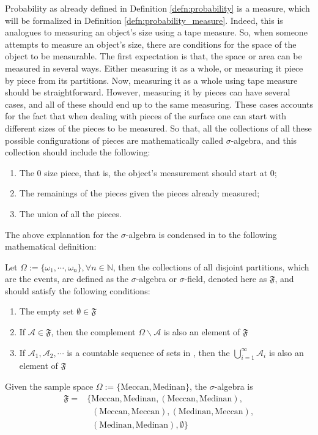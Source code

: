 Probability as already defined in Definition \ref{defn:probability} is a measure, which will be formalized in Definition \ref{defn:probability_measure}. Indeed, this is analogues to measuring an object's size using a tape measure. So, when someone attempts to measure an object's size, there are conditions for the space of the object to be measurable. The first expectation is that, the space or area can be measured in several ways. Either measuring it as a whole, or measuring it piece by piece from its partitions. Now, measuring it as a whole using tape measure should be straightforward. However, measuring it by pieces can have several cases, and all of these should end up to the same measuring. These cases accounts for the fact that when dealing with pieces of the surface one can start with different sizes of the pieces to be measured. So that, all the collections of all these possible configurations of pieces are mathematically called $\sigma$-algebra, and this collection should include the following:
\begin{enumerate}
    \item The 0 size piece, that is, the object's measurement should start at 0;
    \item The remainings of the pieces given the pieces already measured;
    \item The union of all the pieces.
\end{enumerate}
The above explanation for the $\sigma$-algebra is condensed in to the following mathematical definition:
\begin{defn}\label{defn:sigma_algebra}
Let $\Omega:=\{\omega_1,\cdots,\omega_n\}, \forall n\in\mathbb{N}$, then the collections of all disjoint partitions, which are the events, are defined as the $\sigma$-algebra or $\sigma$-field, denoted here as $\mathfrak{F}$, and should satisfy the following conditions:
\begin{enumerate}
    \item The empty set $\emptyset\in\mathfrak{F}$
    \item If $\mathscr{A}\in\mathfrak{F}$, then the complement $\Omega\backslash\mathscr{A}$ is also an element of $\mathfrak{F}$
    \item If $\mathscr{A}_1,\mathscr{A}_2,\cdots$ is a countable sequence of sets in , then the $\bigcup_{i=1}^{\infty}\mathscr{A}_i$ is also an element of $\mathfrak{F}$
\end{enumerate}
\end{defn}
\begin{exmp}
Given the sample space $\Omega:=\{\text{Meccan},\text{Medinan}\}$, the $\sigma$-algebra is
\begin{align}
    \mathfrak{F}=&\{\text{Meccan},\text{Medinan},(\text{Meccan},\text{Medinan}),\nonumber\\
    &\;\;(\text{Meccan},\text{Meccan}), (\text{Medinan},\text{Meccan}),\nonumber\\
    &\;\;(\text{Medinan},\text{Medinan}),\emptyset\}
\end{align}

\end{exmp}
